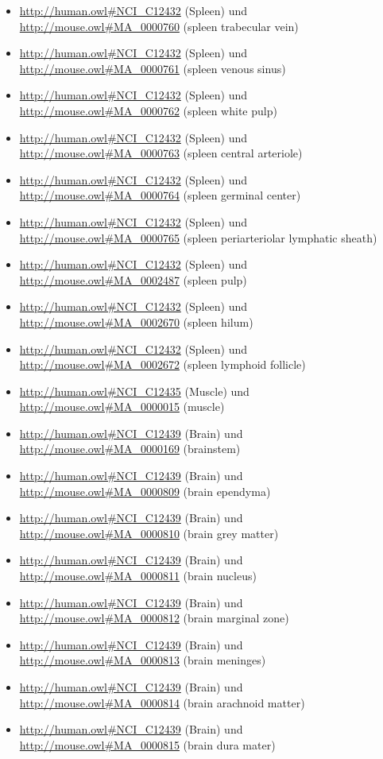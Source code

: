 \begin{itemize}
	\item \url{http://human.owl#NCI_C12432} (Spleen) und \url{http://mouse.owl#MA_0000760} (spleen trabecular vein)
	\item \url{http://human.owl#NCI_C12432} (Spleen) und \url{http://mouse.owl#MA_0000761} (spleen venous sinus)
	\item \url{http://human.owl#NCI_C12432} (Spleen) und \url{http://mouse.owl#MA_0000762} (spleen white pulp)
	\item \url{http://human.owl#NCI_C12432} (Spleen) und \url{http://mouse.owl#MA_0000763} (spleen central arteriole)
	\item \url{http://human.owl#NCI_C12432} (Spleen) und \url{http://mouse.owl#MA_0000764} (spleen germinal center)
	\item \url{http://human.owl#NCI_C12432} (Spleen) und \url{http://mouse.owl#MA_0000765} (spleen periarteriolar lymphatic sheath)
	\item \url{http://human.owl#NCI_C12432} (Spleen) und \url{http://mouse.owl#MA_0002487} (spleen pulp)
	\item \url{http://human.owl#NCI_C12432} (Spleen) und \url{http://mouse.owl#MA_0002670} (spleen hilum)
	\item \url{http://human.owl#NCI_C12432} (Spleen) und \url{http://mouse.owl#MA_0002672} (spleen lymphoid follicle)
	\item \url{http://human.owl#NCI_C12435} (Muscle\textunderscoreTissue) und \url{http://mouse.owl#MA_0000015} (muscle)
	\item \url{http://human.owl#NCI_C12439} (Brain) und \url{http://mouse.owl#MA_0000169} (brainstem)
	\item \url{http://human.owl#NCI_C12439} (Brain) und \url{http://mouse.owl#MA_0000809} (brain ependyma)
	\item \url{http://human.owl#NCI_C12439} (Brain) und \url{http://mouse.owl#MA_0000810} (brain grey matter)
	\item \url{http://human.owl#NCI_C12439} (Brain) und \url{http://mouse.owl#MA_0000811} (brain nucleus)
	\item \url{http://human.owl#NCI_C12439} (Brain) und \url{http://mouse.owl#MA_0000812} (brain marginal zone)
	\item \url{http://human.owl#NCI_C12439} (Brain) und \url{http://mouse.owl#MA_0000813} (brain meninges)
	\item \url{http://human.owl#NCI_C12439} (Brain) und \url{http://mouse.owl#MA_0000814} (brain arachnoid matter)
	\item \url{http://human.owl#NCI_C12439} (Brain) und \url{http://mouse.owl#MA_0000815} (brain dura mater)

\end{itemize}
